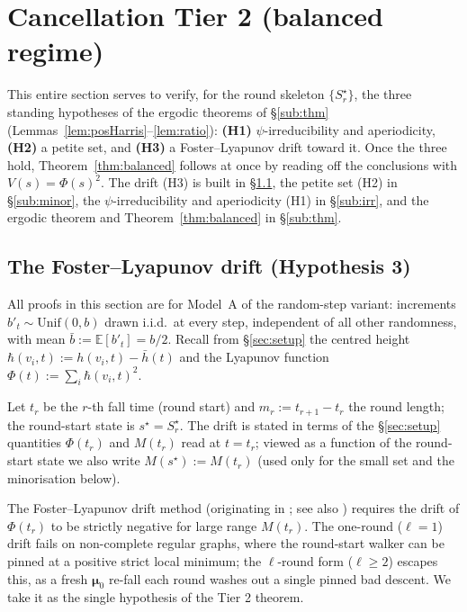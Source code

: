 \documentclass[11pt]{article}
\theoremstyle{definition}
\begin{document}
\section{Cancellation Tier 2 (balanced regime)}
\label{sec:balanced}

This entire section serves to verify, for the round skeleton $\{S^{\star}_r\}$, the three standing hypotheses of the ergodic theorems of \S\ref{sub:thm} (Lemmas~\ref{lem:posHarris}--\ref{lem:ratio}): \textbf{(H1)} $\psi$-irreducibility and aperiodicity, \textbf{(H2)} a petite set, and \textbf{(H3)} a Foster--Lyapunov drift toward it. Once the three hold, Theorem~\ref{thm:balanced} follows at once by reading off the conclusions with $V(s) = \Phi(s)^2$. The drift (H3) is built in \S\ref{sub:drift}, the petite set (H2) in \S\ref{sub:minor}, the $\psi$-irreducibility and aperiodicity (H1) in \S\ref{sub:irr}, and the ergodic theorem and Theorem~\ref{thm:balanced} in \S\ref{sub:thm}.

\subsection{The Foster--Lyapunov drift (Hypothesis 3)}
\label{sub:drift}

All proofs in this section are for Model~A of the random-step variant: increments $b'_t \sim \mathrm{Unif}(0,b)$ drawn i.i.d.\ at every step, independent of all other randomness, with mean $\bar b := \mathbb{E}[b'_t] = b/2$. Recall from \S\ref{sec:setup} the centred height $\hbar(v_i,t) := h(v_i,t) - \bar h(t)$ and the Lyapunov function $\Phi(t) := \sum_i \hbar(v_i,t)^2$.

Let $t_r$ be the $r$-th fall time (round start) and $m_r := t_{r+1}-t_r$ the round length; the round-start state is $s^{\star} = S^{\star}_r$. The drift is stated in terms of the \S\ref{sec:setup} quantities $\Phi(t_r)$ and $M(t_r)$ read at $t = t_r$; viewed as a function of the round-start state we also write $M(s^{\star}) := M(t_r)$ (used only for the small set and the minorisation below).

The Foster--Lyapunov drift method \cite[Ch.~11, Thm.~11.0.1]{MeynTweedie2009} (originating in \cite{Foster1953}; see also \cite[\S7.1]{Bremaud1999}) requires the drift of $\Phi(t_r)$ to be strictly negative for large range $M(t_r)$. The one-round ($\ell=1$) drift fails on non-complete regular graphs, where the round-start walker can be pinned at a positive strict local minimum; the $\ell$-round form ($\ell \geq 2$) escapes this, as a fresh $\boldsymbol{\mu}_0$ re-fall each round washes out a single pinned bad descent. We take it as the single hypothesis of the Tier 2 theorem.
\end{document}
